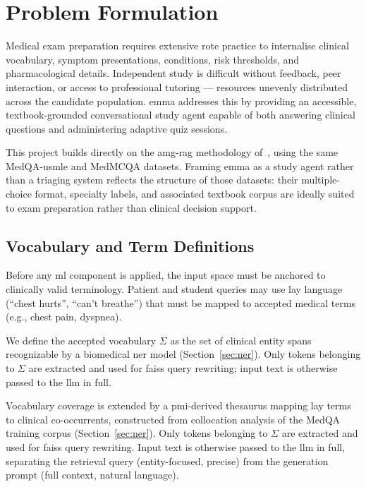 \section{Problem Formulation}
\label{sec:problem}

Medical exam preparation requires extensive rote practice to internalise clinical vocabulary, symptom presentations, conditions, risk thresholds, and pharmacological details. Independent study is difficult without feedback, peer interaction, or access to professional tutoring --- resources unevenly distributed across the candidate population. \gls{emma} addresses this by providing an accessible, textbook-grounded conversational study agent capable of both answering clinical questions and administering adaptive quiz sessions.

This project builds directly on the \gls{amg-rag} methodology of~\citet{rezaei2025}, using the same MedQA-\gls{usmle} and MedMCQA datasets. Framing \gls{emma} as a study agent rather than a triaging system reflects the structure of those datasets: their multiple-choice format, specialty labels, and associated textbook corpus are ideally suited to exam preparation rather than clinical decision support.

\subsection{Vocabulary and Term Definitions}

Before any \gls{ml} component is applied, the input space must be anchored to clinically valid terminology. Patient and student queries may use lay language (``chest hurts'', ``can't breathe'') that must be mapped to accepted medical terms (e.g., chest pain, dyspnea).

We define the accepted vocabulary $\Sigma$ as the set of clinical entity spans recognizable by a biomedical \gls{ner} model (Section~\ref{sec:ner}). Only tokens belonging to $\Sigma$ are extracted and used for \gls{faiss} query rewriting; input text is otherwise passed to the \gls{llm} in full.

Vocabulary coverage is extended by a \gls{pmi}-derived thesaurus mapping lay terms to clinical co-occurrents, constructed from collocation analysis of the MedQA training corpus (Section~\ref{sec:ner}). Only tokens belonging to $\Sigma$ are extracted and used for \gls{faiss} query rewriting. Input text is otherwise passed to the \gls{llm} in full, separating the retrieval query (entity-focused, precise) from the generation prompt (full context, natural language).

